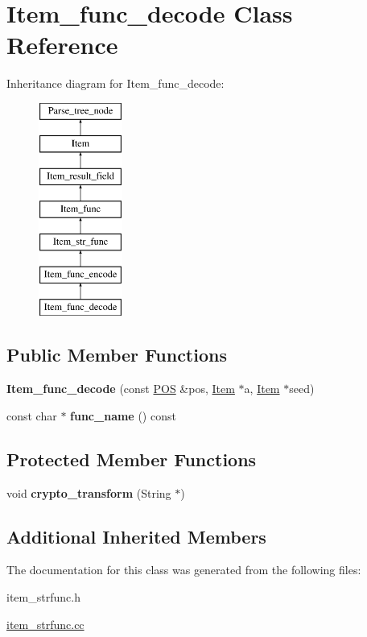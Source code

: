 \hypertarget{classItem__func__decode}{}\section{Item\+\_\+func\+\_\+decode Class Reference}
\label{classItem__func__decode}
Inheritance diagram for Item\+\_\+func\+\_\+decode\+:\begin{figure}[H]
\begin{center}
\leavevmode
\includegraphics[height=7.000000cm]{classItem__func__decode}
\end{center}
\end{figure}
\subsection*{Public Member Functions}
\begin{DoxyCompactItemize}
\item 
\mbox{\label{classItem__func__decode_a2f4b70591a21af65021739bc6397fdf6}} 
{\bfseries Item\+\_\+func\+\_\+decode} (const \mbox{\hyperlink{structYYLTYPE}{P\+OS}} \&pos, \mbox{\hyperlink{classItem}{Item}} $\ast$a, \mbox{\hyperlink{classItem}{Item}} $\ast$seed)
\item 
\mbox{\label{classItem__func__decode_a7a5145fb21a96573794ba95c8a53f65d}} 
const char $\ast$ {\bfseries func\+\_\+name} () const
\end{DoxyCompactItemize}
\subsection*{Protected Member Functions}
\begin{DoxyCompactItemize}
\item 
\mbox{\label{classItem__func__decode_a5716b974117736601ee298f7dceb77f2}} 
void {\bfseries crypto\+\_\+transform} (String $\ast$)
\end{DoxyCompactItemize}
\subsection*{Additional Inherited Members}


The documentation for this class was generated from the following files\+:\begin{DoxyCompactItemize}
\item 
item\+\_\+strfunc.\+h\item 
\mbox{\hyperlink{item__strfunc_8cc}{item\+\_\+strfunc.\+cc}}\end{DoxyCompactItemize}
